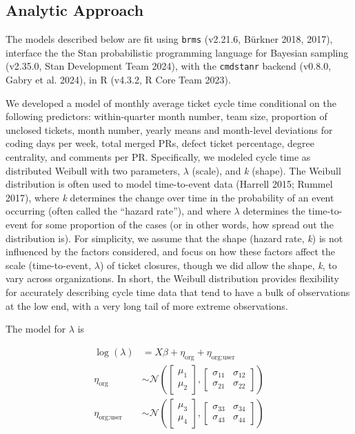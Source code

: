 \documentclass[
]{article}
\begin{document}
\subsection{Analytic Approach}\label{analytic-approach}

The models described below are fit using \texttt{brms} (v2.21.6, Bürkner
2018, 2017), interface the the Stan probabilistic programming language
for Bayesian sampling (v2.35.0, Stan Development Team 2024), with the
\texttt{cmdstanr} backend (v0.8.0, Gabry et al. 2024), in R (v4.3.2, R
Core Team 2023).

We developed a model of monthly average ticket cycle time conditional on
the following predictors: within-quarter month number, team size,
proportion of unclosed tickets, month number, yearly means and
month-level deviations for coding days per week, total merged PRs,
defect ticket percentage, degree centrality, and comments per PR.
Specifically, we modeled cycle time as distributed Weibull with two
parameters, \(\lambda\) (scale), and \emph{k} (shape). The Weibull
distribution is often used to model time-to-event data (Harrell 2015;
Rummel 2017), where \emph{k} determines the change over time in the
probability of an event occurring (often called the ``hazard rate''),
and where \(\lambda\) determines the time-to-event for some proportion
of the cases (or in other words, how spread out the distribution is).
For simplicity, we assume that the shape (hazard rate, \emph{k}) is not
influenced by the factors considered, and focus on how these factors
affect the scale (time-to-event, \(\lambda\)) of ticket closures, though
we did allow the shape, \emph{k}, to vary across organizations. In
short, the Weibull distribution provides flexibility for accurately
describing cycle time data that tend to have a bulk of observations at
the low end, with a very long tail of more extreme observations.

The model for \(\lambda\) is

\begin{equation}
\begin{aligned}
\log(\lambda) &= X\beta + \eta_{\text{org}} + \eta_{\text{org:user}} \\
\eta_{\text{org}} &\sim \mathcal{N}\left(\begin{bmatrix} \mu_1 \\ \mu_2 \end{bmatrix}, \begin{bmatrix} \sigma_{11} & \sigma_{12} \\ \sigma_{21} & \sigma_{22} \end{bmatrix}\right) \\
\eta_{\text{org:user}} &\sim \mathcal{N}\left(\begin{bmatrix} \mu_3 \\ \mu_4 \end{bmatrix}, \begin{bmatrix} \sigma_{33} & \sigma_{34} \\ \sigma_{43} & \sigma_{44} \end{bmatrix}\right) 
\end{aligned}
\end{equation}
\end{document}
